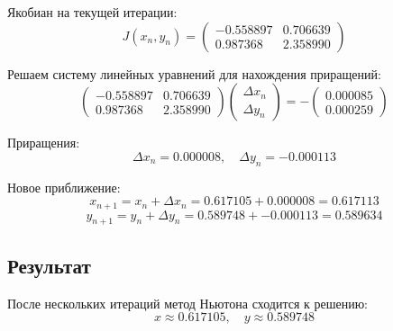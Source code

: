 \documentclass{article}
\begin{document}
Якобиан на текущей итерации:
\[
J(x_n, y_n) = \begin{pmatrix}
-0.558897 & 0.706639 \\
0.987368 & 2.358990
\end{pmatrix}
\]

Решаем систему линейных уравнений для нахождения приращений:
\[
\begin{pmatrix}
-0.558897 & 0.706639 \\
0.987368 & 2.358990
\end{pmatrix}
\begin{pmatrix}
\Delta x_n \\
\Delta y_n
\end{pmatrix}
= -\begin{pmatrix}
0.000085 \\
0.000259
\end{pmatrix}
\]

Приращения:
\[
\Delta x_n = 0.000008, \quad \Delta y_n = -0.000113
\]

Новое приближение:
\[
x_{n+1} = x_n + \Delta x_n = 0.617105 + 0.000008 = 0.617113
\]
\[
y_{n+1} = y_n + \Delta y_n = 0.589748 + -0.000113 = 0.589634
\]

\subsection*{Результат}

После нескольких итераций метод Ньютона сходится к решению:
\[
x \approx 0.617105, \quad y \approx 0.589748
\]
\end{document}

